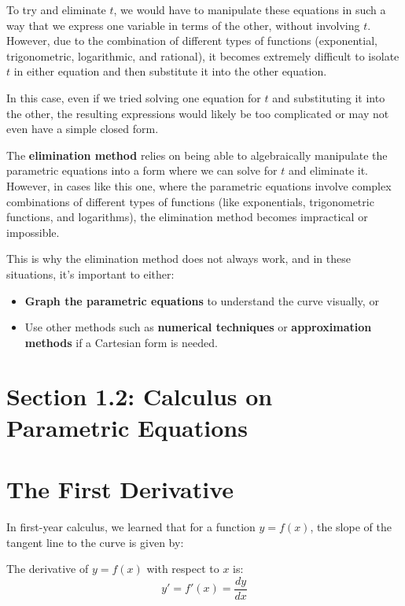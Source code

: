 \documentclass{article}
\begin{document}
\begin{warningbox}
    \begin{notebox}
        To try and eliminate \( t \), we would have to manipulate these equations in such a way that we express one variable in terms of the other, without involving \( t \). However, due to the combination of different types of functions (exponential, trigonometric, logarithmic, and rational), it becomes extremely difficult to isolate \( t \) in either equation and then substitute it into the other equation.
    
        In this case, even if we tried solving one equation for \( t \) and substituting it into the other, the resulting expressions would likely be too complicated or may not even have a simple closed form.
    \end{notebox}
    \begin{conceptbox}
        The \textbf{elimination method} relies on being able to algebraically manipulate the parametric equations into a form where we can solve for \( t \) and eliminate it. However, in cases like this one, where the parametric equations involve complex combinations of different types of functions (like exponentials, trigonometric functions, and logarithms), the elimination method becomes impractical or impossible.
    
        This is why the elimination method does not always work, and in these situations, it's important to either:
        \begin{itemize}
            \item \textbf{Graph the parametric equations} to understand the curve visually, or
            \item Use other methods such as \textbf{numerical techniques} or \textbf{approximation methods} if a Cartesian form is needed.
        \end{itemize}
    \end{conceptbox}  
\end{warningbox}
\newpage

\section*{Section 1.2: Calculus on Parametric Equations}
\section*{The First Derivative}

In first-year calculus, we learned that for a function \( y = f(x) \), the slope of the tangent line to the curve is given by:
\begin{corollarybox}
The derivative of \( y = f(x) \) with respect to \( x \) is:
\[
    y' = f'(x) = \frac{dy}{dx}
\]
\end{corollarybox}
\end{document}
